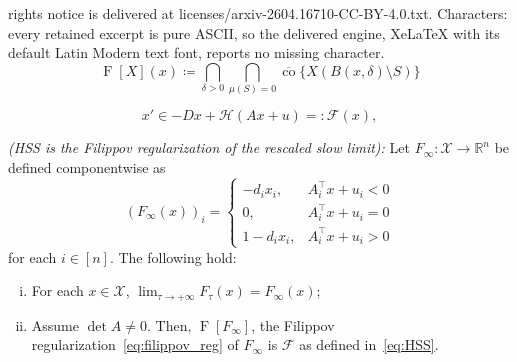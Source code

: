 \documentclass[10pt,a4paper]{amsart}
\newcommand{\R}{\mathbb R}
\newcommand{\X}{\mathcal X}
\newcommand{\longthmtitle}[1]{\mbox{}{\textit{(#1):}}}
\newcommand{\mc}{\mathcal}
\begin{document}
rights notice is delivered at licenses/arxiv-2604.16710-CC-BY-4.0.txt. Characters: every retained excerpt is pure ASCII, so the delivered engine, XeLaTeX with its default Latin Modern text font, reports no missing character.
\begin{equation}\label{eq:filippov_reg}
    \operatorname{F}[X](x) \coloneqq \bigcap_{\delta>0}\bigcap_{\mu(S)=0} \overline{\operatorname{co}}\{X(B(x, \delta)\setminus S)\}
\end{equation}

\begin{equation}\label{eq:HSS}\tag{HSS}
 x' \in -Dx+\mc H(Ax + u) =: \mc F(x),
\end{equation}

\begin{proposition}\longthmtitle{HSS is the Filippov regularization of the rescaled slow limit}
\label{prop:t-LTN_to_slow_limit}
Let \(F_\infty: \X \rightarrow \R^n\) be defined componentwise as
\begin{equation}\label{eq:slow_pointwise}
(F_\infty(x))_i = \begin{cases}
    - d_ix_i, & A_i^\top x + u_i < 0\\
    0, & A_i^\top x + u_i = 0\\
    1 - d_ix_i, & A_i^\top x + u_i > 0
\end{cases}
\end{equation}
for each \(i \in [n]\).
The following hold:
    \begin{enumerate}[(i)]
        \item For each \(x \in \X\),
        \(\lim_{\tau\to+\infty} F_\tau(x) = F_\infty(x)\);
        \item Assume \(\det A\neq 0\).
        Then, \(\operatorname{F}[F_\infty]\), the Filippov regularization~\eqref{eq:filippov_reg} of \(F_\infty\) is \(\mc F\) as defined in~\eqref{eq:HSS}.
    \end{enumerate}
\end{proposition}
\end{document}
